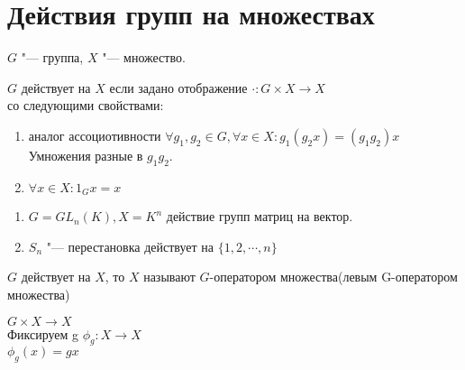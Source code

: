 ﻿\section{Действия групп на множествах}
$G$ "--- группа, $X$ "--- множество.
\begin{Def}
$G$ действует на $X$ если задано отображение $\cdot \colon G \times X \to X$\\
со следующими свойствами:
  \begin{enumerate}
  \item аналог ассоциотивности $\forall g_1, g_2 \in G, \forall x \in X \colon g_1(g_2x) = (g_1g_2)x$\\
  Умножения разные в $g_1g_2$.
  \item $\forall x \in X \colon 1_G x = x$
  \end{enumerate}
\end{Def} 
\begin{exmp}\hfill
\begin{enumerate}
\item $G = GL_n(K), X = K^{n}$ 
действие групп матриц на вектор.
\item 
$S_n$ "--- перестановка действует на $\{1, 2, \cdots, n\}$
\end{enumerate}
\end{exmp}
\begin{Def}
$G$ действует на $X$, то $X$ называют $G$-оператором множества(левым G-оператором множества)\\
\end{Def}
$G \times X \to X$\\
Фиксируем g
$\phi_{g}\colon X \to X$\\
$\phi_{g}(x) = gx$\\

